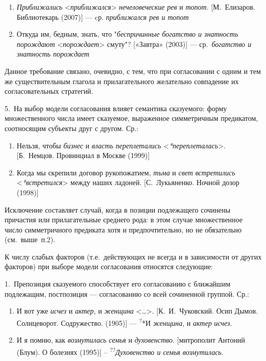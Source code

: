 \begin{enumerate}
  \def\labelenumi{(\arabic{enumi})}
  \setcounter{enumi}{95}
  \item
        \textit{Приближались} \textless*\textit{приближался}\textgreater{}
        \textit{нечеловеческие} \textit{рев} и \textit{топот}. {[}М.~Елизаров.
        Библиотекарь (2007){]} --- cр. \textit{приближался рев и топот}
  \item
        Откуда им, бедным, знать, что "\textit{беспричинные богатство и
          знатность порождают} \textless*\textit{порождает}\textgreater{} смуту"?
        {[}«Завтра» (2003){]} --- ср.~\textit{богатство и знатность порождает}
\end{enumerate}

Данное требование связано, очевидно, с тем, что при согласовании с одним
и тем же существительным глагола и прилагательного желательно совпадение
их согласовательных стратегий.

5.~На выбор модели согласования влияет семантика сказуемого: форму
множественного числа имеет сказуемое, выраженное симметричным
предикатом, соотносящим субъекты друг с другом. Ср.:

\begin{enumerate}
  \def\labelenumi{(\arabic{enumi})}
  \setcounter{enumi}{97}
  \item
        Нельзя, чтобы \textit{бизнес} и \textit{власть} \textit{переплетались}
        \textless{}\textit{*переплеталась}\textgreater. {[}Б.~Немцов. Провинциал
        в Москве (1999){]}
  \item
        Когда мы скрепили договор рукопожатием, \textit{тьма} и \textit{свет}
        \textit{встретились} \textless{}\textit{*встретился}\textgreater{} между
        наших ладоней. {[}С.~Лукьяненко. Ночной дозор (1998){]}
\end{enumerate}

Исключение составляет случай, когда в позиции подлежащего сочинены
причастия или прилагательные среднего рода: в этом случае множественное
число симметричного предиката хотя и предпочтительно, но не обязательно
(см.~выше~п.2).

К числу слабых факторов (т.е.~действующих не всегда и в зависимости от
других факторов) при выборе модели согласования относятся следующие:

1.~Препозиция сказуемого способствует его согласованию с ближайшим
подлежащим, постпозиция --- согласованию со всей сочиненной группой. Ср.:

\begin{enumerate}
  \def\labelenumi{(\arabic{enumi})}
  \setcounter{enumi}{99}
  \item
        И вот уже \textit{исчез} и \textit{актер}, и \textit{женщина}
        \textless\ldots\textgreater. {[}К.~И.~Чуковский. Осип Дымов.
        Солнцеворот. Содружество. (1905){]} --- \textsuperscript{?}*И
        \textit{женщина}, и \textit{актер} \textit{исчез}.
  \item
        И я помню, как \textit{возмутилась} \textit{семья} и \textit{духовенство}.
        {[}митрополит Антоний (Блум). О болезнях (1995){]} --
        \textsuperscript{??}\textit{Духовенство и семья} \textit{возмутилась}.
\end{enumerate}

